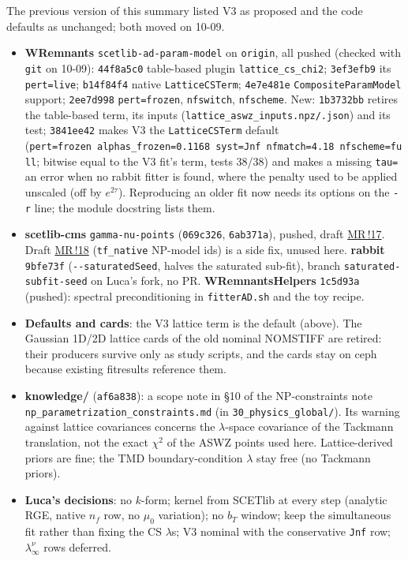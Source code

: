 \documentclass[10pt,a4paper]{article}
\newcommand\code{\nolinkurl}
\newcommand\fit[1]{\textsf{#1}}
\begin{document}
The previous version of this summary listed V3 as proposed and the code defaults as unchanged; both moved on 10-09.
\begin{itemize}
  \item \textbf{WRemnants} \code{scetlib-ad-param-model} on \code{origin}, all pushed (checked with \code{git} on 10-09):
    \code{44f8a5c0} table-based plugin \code{lattice_cs_chi2}; \code{3ef3efb9} its \code{pert=live}; \code{b14f84f4} native
    \code{LatticeCSTerm}; \code{4e7e481e} \code{CompositeParamModel} support; \code{2ee7d998} \code{pert=frozen},
    \code{nfswitch}, \code{nfscheme}. New: \code{1b3732bb} retires the table-based term, its inputs
    (\code{lattice_aswz_inputs.npz/.json}) and its test; \code{3841ee42} makes V3 the \code{LatticeCSTerm} default
    (\code{pert=frozen}\ \code{alphas_frozen=0.1168}\ \code{syst=Jnf}\ \code{nfmatch=4.18}\ \code{nfscheme=full}; bitwise
    equal to the V3 fit's term, tests 38/38) and makes a missing \code{tau=} an error when no rabbit fitter is found,
    where the penalty used to be applied unscaled (off by $e^{2\tau}$). Reproducing an older fit now needs its options on
    the \code{-r} line; the module docstring lists them.
  \item \textbf{scetlib-cms} \code{gamma-nu-points} (\code{069c326}, \code{6ab371a}), pushed, draft
    \href{https://gitlab.cern.ch/scetlib/contrib/scetlib-cms/-/merge_requests/17}{MR\,!17}. Draft
    \href{https://gitlab.cern.ch/scetlib/contrib/scetlib-cms/-/merge_requests/18}{MR\,!18} (\code{tf_native} NP-model
    ids) is a side fix, unused here. \textbf{rabbit} \code{9bfe73f} (\code{--saturatedSeed}, halves the saturated
    sub-fit), branch \code{saturated-subfit-seed} on Luca's fork, no PR. \textbf{WRemnantsHelpers} \code{1c5d93a}
    (pushed): spectral preconditioning in \code{fitterAD.sh} and the toy recipe.
  \item \textbf{Defaults and cards}: the V3 lattice term is the default (above). The Gaussian 1D/2D lattice cards of the
    old nominal \fit{NOMSTIFF} are retired: their producers survive only as study scripts, and the cards stay on ceph
    because existing fitresults reference them.
  \item \textbf{knowledge/} (\code{af6a838}): a scope note in \S10 of the NP-constraints note
    \code{np_parametrization_constraints.md} (in \code{30_physics_global/}). Its warning against lattice covariances concerns
    the $\lambda$-space covariance of the Tackmann translation, not the exact $\chi^2$ of the ASWZ points used here.
    Lattice-derived priors are fine; the TMD boundary-condition $\lambda$ stay free (no Tackmann priors).
  \item \textbf{Luca's decisions}: no $k$-form; kernel from SCETlib at every step (analytic RGE, native $n_f$ row, no
    $\mu_0$ variation); no $b_T$ window; keep the simultaneous fit rather than fixing the CS $\lambda$s; V3 nominal with the
    conservative \code{Jnf} row; $\lambda_\infty^\nu$ rows deferred.
\end{itemize}
\end{document}
